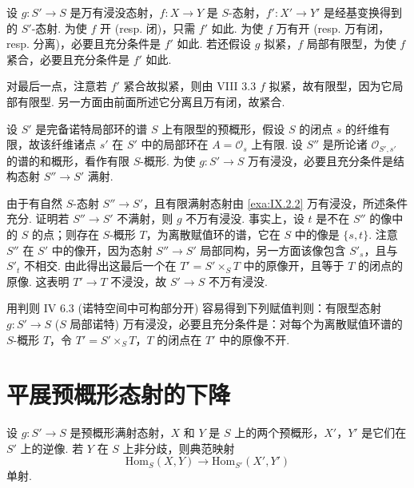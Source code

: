 \begin{proposition}\label{prop:IX.2.4}
设 $g \colon S' \to S$ 是万有浸没态射，$f \colon X \to Y$ 是 $S$-态射，$f' \colon X' \to Y'$ 是经基变换得到的 $S'$-态射. 为使 $f$ 开 (resp. 闭)，只需 $f'$ 如此. 为使 $f$ 万有开 (resp. 万有闭，resp. 分离)，必要且充分条件是 $f'$ 如此. 若还假设 $g$ 拟紧，$f$ 局部有限型，为使 $f$ 紧合，必要且充分条件是 $f'$ 如此.
\end{proposition}

对最后一点，注意若 $f'$ 紧合故拟紧，则由 VIII 3.3 $f$ 拟紧，故有限型，因为它局部有限型. 另一方面由前面所述它分离且万有闭，故紧合.

\begin{proposition}\label{prop:IX.2.5}
设 $S'$ 是完备诺特局部环的谱 $S$ 上有限型的预概形，假设 $S$ 的闭点 $s$ 的纤维有限，故该纤维诸点 $s'$ 在 $S'$ 中的局部环在 $A = \mathcal{O}_s$ 上有限. 设 $S''$ 是所论诸 $\mathcal{O}_{S',s'}$ 的谱的和概形，看作有限 $S$-概形. 为使 $g \colon S' \to S$ 万有浸没，必要且充分条件是结构态射 $S'' \to S'$ 满射.
\end{proposition}

由于有自然 $S$-态射 $S'' \to S'$，且有限满射态射由 \ref{exa:IX.2.2} 万有浸没，所述条件充分. 证明若 $S'' \to S'$ 不满射，则 $g$ 不万有浸没. 事实上，设 $t$ 是不在 $S''$ 的像中的 $S$ 的点；则存在 $S$-概形 $T$，为离散赋值环的谱，它在 $S$ 中的像是 $\{s, t\}$. 注意 $S''$ 在 $S'$ 中的像开，因为态射 $S'' \to S'$ 局部同构，另一方面该像包含 $S'_s$，且与 $S'_t$ 不相交. 由此得出这最后一个在 $T' = S' \times_S T$ 中的原像开，且等于 $T$ 的闭点的原像. 这表明 $T' \to T$ 不浸没，故 $S' \to S$ 不万有浸没.

\begin{remark}\label{rem:IX.2.6}
用判则 IV 6.3 (诺特空间中可构部分开) 容易得到下列赋值判则：有限型态射 $g \colon S' \to S$ ($S$ 局部诺特) 万有浸没，必要且充分条件是：对每个为离散赋值环谱的 $S$-概形 $T$，令 $T' = S' \times_S T$，$T$ 的闭点在 $T'$ 中的原像不开.
\end{remark}

\section{平展预概形态射的下降}

\begin{proposition}\label{prop:IX.3.1}
设 $g \colon S' \to S$ 是预概形满射态射，$X$ 和 $Y$ 是 $S$ 上的两个预概形，$X'$，$Y'$ 是它们在 $S'$ 上的逆像. 若 $Y$ 在 $S$ 上非分歧，则典范映射
\[
\mathrm{Hom}_S(X, Y) \longrightarrow \mathrm{Hom}_{S'}(X', Y')
\]
单射.
\end{proposition}

